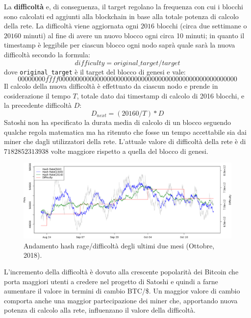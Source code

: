 La \textbf{difficoltà} e, di conseguenza, il target regolano la frequenza con cui i blocchi sono calcolati ed aggiunti alla blockchain in base alla totale potenza di calcolo della rete. La difficoltà viene aggiornata ogni $2016$ blocchi (circa due settimane o $20160$ minuti) al fine di avere un nuovo blocco ogni circa 10 minuti; in quanto il timestamp è leggibile per ciascun blocco ogni nodo saprà quale sarà la nuova difficoltà secondo la formula:
\begin{equation}
     difficulty = original\_target / target
\end{equation}
dove \texttt{original\_target} è il target del blocco di genesi e vale:
\begin{equation}
    00000000ffff0000000000000000000000000000000000000000000000000000
\end{equation}
Il calcolo della nuova difficoltà è effettuato da ciascun nodo e prende in cosiderazione il tempo $T$, totale dato dai timestamp di calcolo di 2016 blocchi, e la precedente difficoltà $D$:
\begin{equation}
    D_{next} = (20160 / T) * D
\end{equation}
Satoshi non ha specificato la durata media di calcolo di un blocco seguendo qualche regola matematica ma ha ritenuto che fosse un tempo accettabile sia dai miner che dagli utilizzatori della rete.\newline
L'attuale valore di difficoltà della rete è di $7182852313938$ volte maggiore rispetto a quella del blocco di genesi.
\begin{figure}[H]
    \centering
    \includegraphics[width=\textwidth]{images/diffvshash.png}
    \caption{Andamento hash rage/difficoltà degli ultimi due mesi (Ottobre, 2018).}
\end{figure}
L'incremento della difficoltà è dovuto alla crescente popolarità dei Bitcoin che porta maggiori utenti a credere nel progetto di Satoshi e quindi a farne aumentare il valore in termini di cambio BTC/\$. Un maggior valore di cambio comporta anche una maggior partecipazione dei miner che, apportando nuova potenza di calcolo alla rete, influenzano il valore della difficoltà.
